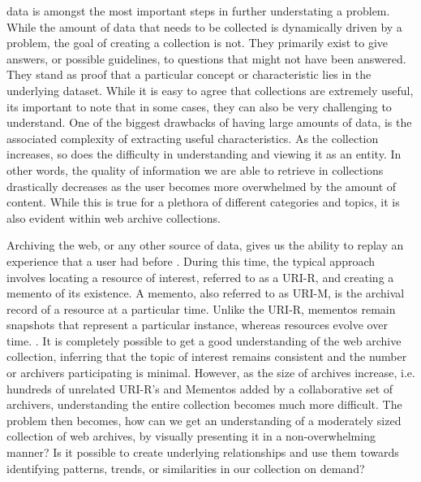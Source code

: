 \documentclass[10pt,journal,compsoc]{IEEEtran}
\begin{document}
 data is amongst the most important steps in further understating a problem. While the amount of data that needs to be collected is dynamically driven by a problem, the goal of creating a collection is not. They primarily exist to give answers, or possible guidelines, to questions that might not have been answered. They stand as proof that a particular concept or characteristic lies in the underlying dataset. While it is easy to agree that collections are extremely useful, its important to note that in some cases, they can also be very challenging to understand. One of the biggest drawbacks of having large amounts of data, is the associated complexity of extracting useful characteristics.  As the collection increases, so does the difficulty in understanding and viewing it as an entity. In other words, the quality of information we are able to retrieve in collections drastically decreases as the user becomes more overwhelmed by the amount of content. While this is true for a plethora of different categories and topics, it is also evident within web archive collections. \par

Archiving the web, or any other source of data, gives us the ability to replay an experience that a user had before \cite{kelly2014archival}. During this time, the typical approach involves locating a resource of interest, referred to as a URI-R, and creating a memento of its existence. A memento, also referred to as URI-M, is the archival record of a resource at a particular time. Unlike the URI-R, mementos remain snapshots that represent a particular instance, whereas resources evolve over time. \cite{van2009memento}. It is completely possible to get a good understanding of the web archive collection, inferring that the topic of interest remains consistent and the number or archivers participating is minimal. However, as the size of archives increase, i.e. hundreds of unrelated URI-R’s and Mementos added by a collaborative set of archivers, understanding the entire collection becomes much more difficult. The problem then becomes, how can we get an understanding of a moderately sized collection of web archives, by visually presenting it in a non-overwhelming manner? Is it possible to create underlying relationships and use them towards identifying patterns, trends, or similarities in our collection on demand? \par
\end{document}
